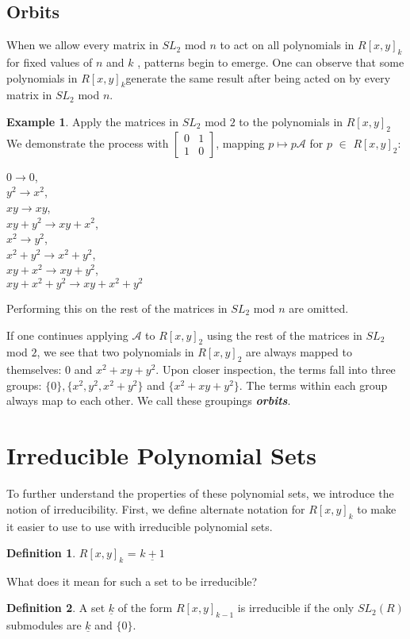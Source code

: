 \documentclass[a4paper,draft]{amsproc}
\theoremstyle{plain}
\theoremstyle{definition}
\newtheorem{exm}{Example}[section]
\newtheorem{dfn}{Definition}[section]
\theoremstyle{remark}
\numberwithin{equation}{section}
\begin{document}
\subsection{Orbits}
When we allow every matrix in $SL_{2}$ mod $n$ to act on all polynomials in $R[x,y]_{k}$for fixed values of $n$ and $k$ , patterns begin to emerge.
One can observe that some polynomials in $R[x,y]_{k}$generate the same result after being acted on by every matrix in $SL_{2}$ mod $n$. 
\begin{exm}
Apply the matrices in $SL_{2}$ mod $2$ to the polynomials in $R[x,y]_{2}$ 
We demonstrate the process with $\begin{bmatrix}
 0&1 \\ 
 1&0 
\end{bmatrix} $, mapping $p \mapsto p\mathcal{A}$ for $p$ $\in$ $R[x,y]_{2}$: \\

\begin{center}
$0 \rightarrow 0$, \\
$y^{2} \rightarrow x^{2}$, \\
$xy \rightarrow xy$, \\
$xy + y^{2} \rightarrow xy + x^{2}$, \\
$x^{2} \rightarrow y^{2}$, \\
$x^{2} + y^{2} \rightarrow x^{2} + y^{2}$, \\
$xy + x^{2} \rightarrow xy + y^{2}$, \\
$xy + x^{2} + y^{2} \rightarrow xy + x^{2} + y^{2}$
\end{center}

Performing this on the rest of the matrices in $SL_{2}$ mod $n$ are omitted.

\end{exm}

If one continues applying $\mathcal{A}$ to $R[x,y]_{2}$ using the rest of the matrices in $SL_{2}$ mod $2$, we see that two polynomials in $R[x,y]_{2}$ are always mapped to themselves: 0 and $x^{2} + xy + y^{2}$. Upon closer inspection, the terms fall into three groups: $\{0\}, \{x^{2}, y^{2}, x^{2} + y^{2}\}$ and $\{x^{2} + xy + y^{2}\}$. The terms within each group always map to each other. We call these groupings \textit{\textbf{orbits}}. 

\section{Irreducible Polynomial Sets}
To further understand the properties of these polynomial sets, we introduce the notion of irreducibility. 
First, we define alternate notation for $R[x,y]_{k}$ to make it easier to use to use with irreducible polynomial sets. 
\begin{dfn}
$R[x,y]_{k}$ = $\underline{k+1}$
\end{dfn} 
What does it mean for such a set to be irreducible? 
\begin{dfn}
A set $\underline{k}$ of the form $R[x,y]_{k-1}$ is irreducible if the only $SL_{2}(R)$ submodules are  $\underline{k}$ and $\{0\}$. 
\end{dfn} 
\end{document}
